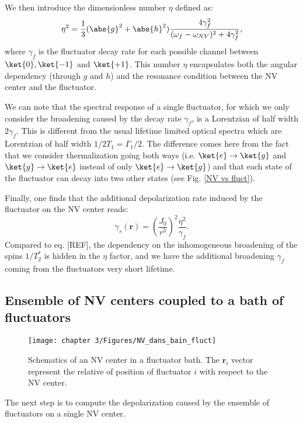\documentclass[a4paper, 11pt]{book}
\begin{document}
We then introduce the dimensionless number $\eta$ defined as:
\begin{equation}
\label{eq eta}
\eta^2=\frac{1}{3} (\abs{g}^2+\abs{h}^2)  \frac{4\gamma_f^2}{(\omega_f - \omega_{NV})^2+4\gamma_f^2},
\end{equation}
where $\gamma_f$ is the fluctuator decay rate for each possible channel between $\ket{0}, \ket{-1}$ and $\ket{+1}$. This number $\eta$ encapsulates both the angular dependency (through $g$ and $h$) and the resonance condition between the NV center and the fluctuator.

We can note that the spectral response of a single fluctuator, for which we only consider the broadening caused by the decay rate $\gamma_f$, is a Lorentzian of half width $2\gamma_f$. This is different from the usual lifetime limited optical spectra which are Lorentzian of half width $1/2T_1=\Gamma_1/2$. The difference comes here from the fact that we consider thermalization going both ways (i.e. $\ket{e} \to \ket{g}$ and $\ket{g} \to \ket{e}$ instead of only $\ket{e} \to \ket{g}$) and that each state of the fluctuator can decay into two other states (see Fig. \ref{NV vs fluct}).

Finally, one finds that the additional depolarization rate induced by the fluctuator on the NV center reads:
\begin{equation}
\gamma_s(\mathbf{r})=\left(\frac{J_0}{r^3}\right)^2 \frac{\eta^2}{\gamma_f}.
\end{equation}
Compared to eq. [REF], the dependency on the inhomogeneous broadening of the spins $1/T_2^*$ is hidden in the $\eta$ factor, and we have the additional broadening $\gamma_f$ coming from the fluctuators very short lifetime.

\subsection{Ensemble of NV centers coupled to a bath of fluctuators}

\begin{figure}[h]
\centering
\texttt{[image: chapter 3/Figures/NV\_dans\_bain\_fluct]}
\caption{Schematics of an NV center in a fluctuator bath. The $\mathbf{r}_i$ vector represent the relative of position of fluctuator $i$ with respect to the NV center.}
\label{NV + bain fluct}
\end{figure}

The next step is to compute the depolarization caused by the ensemble of fluctuators on a single NV center.
\end{document}
